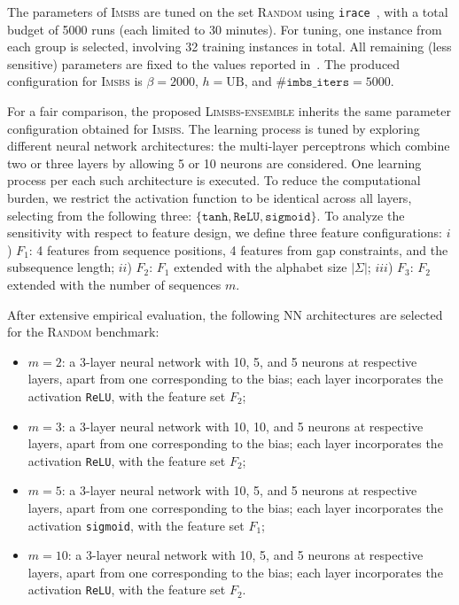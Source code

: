 \documentclass[runningheads]{llncs}
\begin{document}
The parameters of \textsc{Imsbs} are tuned on the set \textsc{Random} using \texttt{irace}~\cite{perez2014analysis}, with a total budget of 5000 runs (each limited to 30 minutes). For tuning, one instance from each group is selected, involving 32 training instances in total. All remaining (less sensitive) parameters are fixed to the values reported  in~\cite{djukanovic2026_eurocast}. The produced configuration for \textsc{Imsbs} is $\beta=2000$, $h=\text{UB}$, and $\#\texttt{imbs\_iters}=5000$.
 
For a fair comparison, the proposed \textsc{Limsbs-ensemble} inherits the same parameter configuration obtained for \textsc{Imsbs}. The learning process is tuned by exploring different neural network architectures: the multi-layer perceptrons which combine two or three layers by  allowing 5 or 10 neurons are considered. One learning process per each such architecture is executed. To reduce the computational burden, we restrict the activation function to be identical across all layers, selecting from the following three: $\{\texttt{tanh}, \texttt{ReLU}, \texttt{sigmoid}\}$. To analyze the sensitivity with respect to feature design, we define three feature configurations: $i$) $F_1$: 4 features from sequence positions, 4 features from gap constraints, and the subsequence length; $ii$) $F_2$: $F_1$ extended with the alphabet size $|\Sigma|$; $iii$) $F_3$: $F_2$ extended with the number of sequences $m$.


After extensive empirical evaluation, the following NN architectures are selected for the \textsc{Random} benchmark:
\begin{itemize}
	\item $m=2$: a 3-layer neural network with  10, 5, and 5 neurons at respective layers, apart from one corresponding to the bias;  each layer incorporates the activation \texttt{ReLU}, with the feature set  $F_2$;
	\item $m=3$:  a 3-layer neural network with  10, 10, and 5 neurons at respective layers, apart from one corresponding to the bias;    each layer incorporates the activation \texttt{ReLU}, with the feature set  $F_2$;
	\item $m=5$:   a 3-layer neural network with  10, 5, and 5 neurons at respective layers, apart from one corresponding to the bias;   each layer incorporates the activation \texttt{sigmoid}, with the feature set  $F_1$;  
	\item $m=10$: a 3-layer neural network with  10, 5, and 5 neurons at respective layers, apart from one corresponding to the bias;    each layer incorporates the activation \texttt{ReLU}, with the feature set  $F_2$.
\end{itemize}
\end{document}
